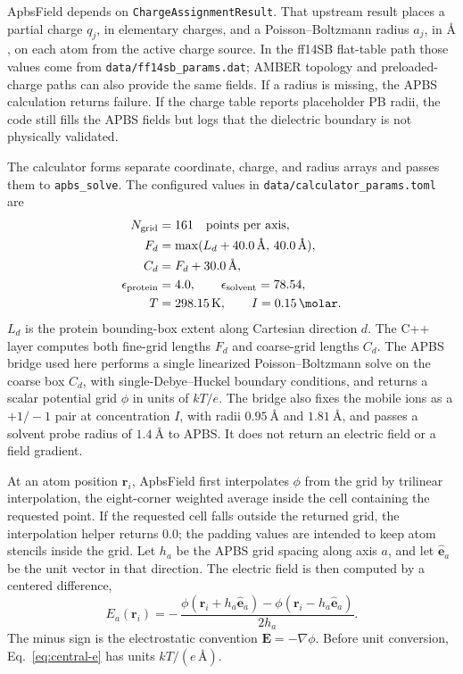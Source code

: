 \documentclass[11pt]{article}
\begin{document}
ApbsField depends on \texttt{ChargeAssignmentResult}. That upstream result
places a partial charge \(q_j\), in elementary charges, and a Poisson--Boltzmann
radius \(a_j\), in \(\si{\angstrom}\), on each atom from the active charge
source. In the ff14SB flat-table path those values come from
\texttt{data/ff14sb\_params.dat}; AMBER topology and preloaded-charge paths
can also provide the same fields. If a radius is missing, the APBS calculation
returns failure. If the charge table reports placeholder PB radii, the code
still fills the APBS fields but logs that the dielectric boundary is not
physically validated.

The calculator forms separate coordinate, charge, and radius arrays and passes
them to \texttt{apbs\_solve}. The configured values in
\texttt{data/calculator\_params.toml} are
\begin{equation}
\begin{aligned}
  N_{\mathrm{grid}} &= 161 \quad \text{points per axis},\\
  F_d &= \max(L_d+\SI{40.0}{\angstrom},\,\SI{40.0}{\angstrom}),\\
  C_d &= F_d+\SI{30.0}{\angstrom},\\
  \epsilon_{\mathrm{protein}} &= 4.0,\qquad
  \epsilon_{\mathrm{solvent}} = 78.54,\\
  T &= \SI{298.15}{\kelvin},\qquad
  I = \SI{0.15}{\molar}.
\end{aligned}
\label{eq:apbs-params}
\end{equation}
\(L_d\) is the protein bounding-box extent along Cartesian direction \(d\).
The C++ layer computes both fine-grid lengths \(F_d\) and coarse-grid lengths
\(C_d\). The APBS bridge used here performs a single linearized
Poisson--Boltzmann solve on the coarse box \(C_d\), with single-Debye--Huckel
boundary conditions, and returns a scalar potential grid \(\phi\) in units of
\(kT/e\). The bridge also fixes the mobile ions as a \(+1/-1\) pair at
concentration \(I\), with radii \(\SI{0.95}{\angstrom}\) and
\(\SI{1.81}{\angstrom}\), and passes a solvent probe radius of
\(\SI{1.4}{\angstrom}\) to APBS. It does not return an electric field or a
field gradient.

At an atom position \(\bm r_i\), ApbsField first interpolates \(\phi\) from the
grid by trilinear interpolation, the eight-corner weighted average inside the
cell containing the requested point. If the requested cell falls outside the
returned grid, the interpolation helper returns \(0.0\); the padding values are
intended to keep atom stencils inside the grid. Let \(h_a\) be the APBS grid
spacing along axis \(a\), and let \(\hat{\bm e}_a\) be the unit vector in that
direction. The electric field is then computed by a centered difference,
\begin{equation}
  E_a(\bm r_i)
  =
  -\,\frac{
    \phi(\bm r_i+h_a\hat{\bm e}_a)
    -
    \phi(\bm r_i-h_a\hat{\bm e}_a)}
  {2h_a}.
  \label{eq:central-e}
\end{equation}
The minus sign is the electrostatic convention \(\bm E=-\nabla\phi\). Before
unit conversion, Eq.~\eqref{eq:central-e} has units \(kT/(e\,\si{\angstrom})\).
\end{document}
